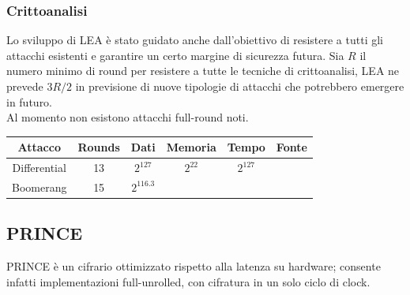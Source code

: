 \documentclass[target=bach,aauheader=,style=]{thud}
\begin{document}
			\subsubsection{Crittoanalisi}
			Lo sviluppo di LEA è stato guidato anche dall'obiettivo di resistere a tutti gli attacchi esistenti e garantire un certo margine di sicurezza futura. Sia $R$ il numero minimo di round per resistere a tutte le tecniche di crittoanalisi, LEA ne prevede $3R/2$ in previsione di nuove tipologie di attacchi che potrebbero emergere in futuro.\\
			Al momento non esistono attacchi full-round noti.
			\begin{center}
				\begin{tabular}{ |c|c|c|c|c|c| } 
					\hline
					Attacco & Rounds & Dati & Memoria & Tempo & Fonte \\ 
					\hline 
					\hline
					Differential & 13 & $2^{127}$ & $2^{22}$ & $2^{127}$ & \cite{leadiff} \\
					\hline
					Boomerang & 15 & $2^{116.3}$ & & & \cite{lea} \\
					\hline
				\end{tabular}
			\end{center}
		\subsection{PRINCE}
		\label{ssec:prince}
			PRINCE è un cifrario ottimizzato rispetto alla latenza su  hardware; consente infatti implementazioni full-unrolled, con cifratura in un solo ciclo di clock\cite{prince}.
\end{document}
